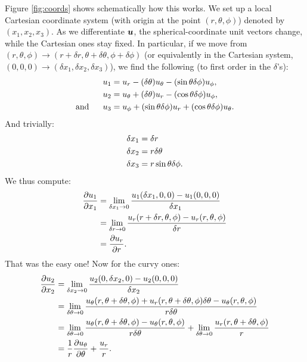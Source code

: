 \documentclass[12pt]{article}
\begin{document}
Figure \ref{fig:coords} shows schematically how this works. We set up a local Cartesian coordinate system (with origin at the point $(r,\theta,\phi)$) denoted by $(x_1,x_2,x_3)$. As we differentiate $\bm{u}$, the spherical-coordinate unit vectors change, while the Cartesian ones stay fixed. In particular, if we move from $(r,\theta,\phi)\rightarrow (r+\delta r, \theta + \delta\theta, \phi + \delta\phi)$ (or equivalently in the Cartesian system, $(0, 0, 0)\rightarrow (\delta x_1, \delta x_2, \delta x_3)$), we find the following (to first order in the $\delta$'s):
\begin{subequations}
\begin{align}
	u_1 &= u_r - (\delta\theta)u_\theta - (\sin\theta\delta\phi)u_\phi,\\ 
	u_2 &= u_\theta + (\delta\theta)u_r - (\cos\theta\delta\phi)u_\phi, \\ 
	\text{and}\ \ \ \ \  u_3 &= u_\phi + (\sin\theta\delta\phi)u_r + (\cos\theta\delta\phi)u_\theta.
\end{align}
\end{subequations}
And trivially:
\begin{subequations}
	\begin{align}
		\delta x_1 &= \delta r \\ 
		\delta x_2 &= r\delta\theta\\
		\delta x_3 &= r\sin\theta\delta\phi.
	\end{align}
\end{subequations}
We thus compute:
\begin{align}
	\frac{\partial u_1}{\partial x_1} &= \lim_{\delta x_1\rightarrow0}\frac{u_1(\delta x_1, 0, 0) - u_1(0,0,0)}{\delta x_1}\nonumber\\
	&=  \lim_{\delta r\rightarrow0}\frac{u_r(r+\delta r, \theta, \phi) - u_r(r,\theta,\phi)}{\delta r}\nonumber\\
	&= \frac{\partial u_r}{\partial r}.
\end{align}
That was the easy one! Now for the curvy ones:
\begin{align}
	\frac{\partial u_2}{\partial x_2} &= \lim_{\delta x_2\rightarrow0}\frac{u_2(0, \delta x_2, 0) - u_2(0,0,0)}{\delta x_2}\nonumber\\
	&=  \lim_{\delta \theta\rightarrow0}\frac{u_\theta(r, \theta+\delta\theta, \phi) + u_r(r,\theta+\delta\theta,\phi)\delta\theta - u_\theta(r,\theta,\phi)}{r\delta\theta}\nonumber\\
	&= \lim_{\delta \theta\rightarrow0}\frac{u_\theta(r, \theta+\delta\theta, \phi) - u_\theta(r,\theta,\phi)}{r\delta\theta} + \lim_{\delta \theta\rightarrow0} \frac{u_r(r,\theta+\delta\theta,\phi)}{r} \nonumber\\
	&= \frac{1}{r}\frac{\partial u_\theta}{\partial\theta} + \frac{u_r}{r}.
\end{align}
\end{document}
